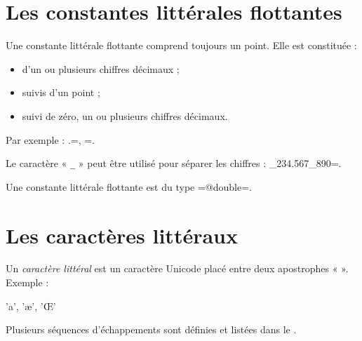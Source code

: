 \section{Les constantes littérales flottantes}

Une constante littérale flottante comprend toujours un point. Elle est constituée :
\begin{itemize}
  \item d'un ou plusieurs chiffres décimaux ;
  \item suivis d'un point ;
  \item suivi de zéro, un ou plusieurs chiffres décimaux.
\end{itemize}

Par exemple : .=, =.

Le caractère « \texttt{\_} » peut être utilisé pour séparer les chiffres : _234.567_890=.

Une constante littérale flottante est du type \ggs=@double=.




\section{Les caractères littéraux}

Un \emph{caractère littéral} est un caractère Unicode placé entre deux apostrophes « \texttt{\textquotesingle} ». Exemple :

\begin{galgas}
 'a', 'æ', 'Œ'
\end{galgas}

Plusieurs séquences d'échappements sont définies et listées dans le .

